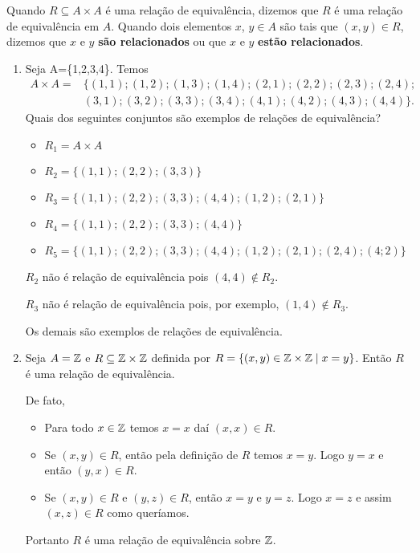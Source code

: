 Quando $R\subseteq A \times A$ {\'e} uma rela{\c c}{\~a}o de equival{\^e}ncia, dizemos que $R$ {\'e} uma rela{\c c}{\~a}o de equival{\^e}ncia em $A$. Quando dois elementos $x$, $y \in A$ s{\~a}o tais que $(x,y) \in R$, dizemos que $x$ e $y$ \textbf{s{\~a}o relacionados} ou que $x$ e $y$ \textbf{estão relacionados}.

\begin{exemplos}
	\begin{enumerate}
		\item Seja A=\{1,2,3,4\}. Temos
		\begin{align*}
			A\times A = &\{(1,1);(1,2);(1,3);(1,4);(2,1);(2,2);(2,3);(2,4);\\ &(3,1);(3,2);(3,3);(3,4);(4,1);(4,2);(4,3);(4,4)\}.
		\end{align*}
		Quais dos seguintes conjuntos são exemplos de rela{\c c}{\~o}es de equival{\^e}ncia?
		\begin{itemize}
			\item $R_{1}= A\times A$
			\item $R_{2}=\{(1,1);(2,2);(3,3)\}$
			\item $R_{3}=\{(1,1);(2,2);(3,3);(4,4);(1,2);(2,1)\}$
			\item $R_{4}=\{(1,1);(2,2);(3,3);(4,4)\}$
			\item $R_{5}=\{(1,1);(2,2);(3,3);(4,4);(1,2);(2,1);(2,4);(4;2)\}$
		\end{itemize}
		\begin{solucao}
			$R_2$ não é relação de equivalência pois $(4,4) \notin R_2$.

			$R_3$ não é relação de equivalência pois, por exemplo, $(1,4) \notin R_3$.

			Os demais são exemplos de relações de equivalência.
		\end{solucao}
		
		\item Seja $A = \mathbb{Z}$ e $R\subseteq \mathbb{Z}\times \mathbb{Z}$ definida por $R = \{(x,y)\in \mathbb{Z} \times \mathbb{Z} \mid x = y\}$.
		Então $R$ {\'e} uma rela{\c c}{\~a}o de equival{\^e}ncia.
		\begin{solucao}
			De fato,
			\begin{itemize}
				\item Para todo $x \in \mathbb{Z}$ temos $x = x$ daí $(x,x) \in R$.
				\item Se $(x,y)\in R$, então pela definição de $R$ temos $x = y$. Logo $y = x$ e então $(y,x)\in R$.
				\item Se $(x,y) \in R$ e $(y,z) \in R$, então  $x = y$ e $y = z$. Logo $x = z$ e assim $(x,z)\in R$ como queríamos.
			\end{itemize}
			Portanto $R$ é uma relação de equivalência sobre $\mathbb{Z}$.
		\end{solucao}
		

\end{enumerate}
\end{exemplos}
